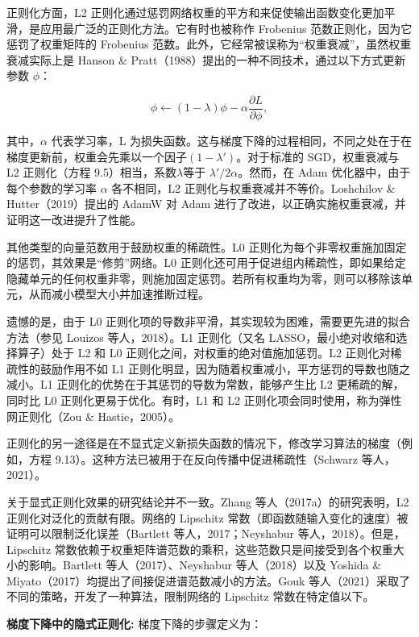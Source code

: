 正则化方面，L2 正则化通过惩罚网络权重的平方和来促使输出函数变化更加平滑，是应用最广泛的正则化方法。它有时也被称作 Frobenius 范数正则化，因为它惩罚了权重矩阵的 Frobenius 范数。此外，它经常被误称为“权重衰减”，虽然权重衰减实际上是 Hanson \& Pratt（1988）提出的一种不同技术，通过以下方式更新参数 \(\phi\)：

\begin{equation}
\phi \leftarrow (1 - \lambda)\phi - \alpha \frac{\partial L}{\partial \phi}, 
\end{equation}

其中，\(\alpha\) 代表学习率，L 为损失函数。这与梯度下降的过程相同，不同之处在于在梯度更新前，权重会先乘以一个因子\((1−\lambda \prime)\)。对于标准的 SGD，权重衰减与 L2 正则化（方程 9.5）相当，系数\(\lambda\)等于 \(\lambda\prime/{2\alpha}\)。然而，在 Adam 优化器中，由于每个参数的学习率 \(\alpha\) 各不相同，L2 正则化与权重衰减并不等价。Loshchilov \& Hutter（2019）提出的 AdamW 对 Adam 进行了改进，以正确实施权重衰减，并证明这一改进提升了性能。

其他类型的向量范数用于鼓励权重的稀疏性。L0 正则化为每个非零权重施加固定的惩罚，其效果是“修剪”网络。L0 正则化还可用于促进组内稀疏性，即如果给定隐藏单元的任何权重非零，则施加固定惩罚。若所有权重均为零，则可以移除该单元，从而减小模型大小并加速推断过程。

遗憾的是，由于 L0 正则化项的导数非平滑，其实现较为困难，需要更先进的拟合方法（参见 Louizos 等人，2018）。L1 正则化（又名 LASSO，最小绝对收缩和选择算子）处于 L2 和 L0 正则化之间，对权重的绝对值施加惩罚。L2 正则化对稀疏性的鼓励作用不如 L1 正则化明显，因为随着权重减小，平方惩罚的导数也随之减小。L1 正则化的优势在于其惩罚的导数为常数，能够产生比 L2 更稀疏的解，同时比 L0 正则化更易于优化。有时，L1 和 L2 正则化项会同时使用，称为弹性网正则化（Zou \& Hastie，2005）。

正则化的另一途径是在不显式定义新损失函数的情况下，修改学习算法的梯度（例如，方程 9.13）。这种方法已被用于在反向传播中促进稀疏性（Schwarz 等人，2021）。

关于显式正则化效果的研究结论并不一致。Zhang 等人（2017a）的研究表明，L2 正则化对泛化的贡献有限。网络的 Lipschitz 常数（即函数随输入变化的速度）被证明可以限制泛化误差（Bartlett 等人，2017；Neyshabur 等人，2018）。但是，Lipschitz 常数依赖于权重矩阵谱范数的乘积，这些范数只是间接受到各个权重大小的影响。Bartlett 等人（2017）、Neyshabur 等人（2018）以及 Yoshida \& Miyato（2017）均提出了间接促进谱范数减小的方法。Gouk 等人（2021）采取了不同的策略，开发了一种算法，限制网络的 Lipschitz 常数在特定值以下。

\textbf{梯度下降中的隐式正则化:} 梯度下降的步骤定义为：

